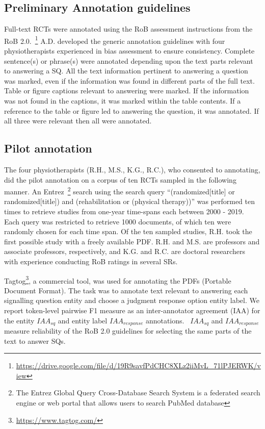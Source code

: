 \documentclass{IOS-Book-Article}
\begin{document}
\subsection{Preliminary Annotation guidelines}
\label{subsec:annot_guide}
%
Full-text RCTs were annotated using the RoB assessment instructions from the RoB 2.0.~\footnote{\url{https://drive.google.com/file/d/19R9savfPdCHC8XLz2iiMvL_71lPJERWK/view}}
A.D. developed the generic annotation guidelines with four physiotherapists experienced in bias assessment to ensure consistency.
Complete sentence(s) or phrase(s) were annotated depending upon the text parts relevant to answering a SQ.
All the text information pertinent to answering a question was marked, even if the information was found in different parts of the full text.
Table or figure captions relevant to answering were marked.
If the information was not found in the captions, it was marked within the table contents.
If a reference to the table or figure led to answering the question, it was annotated.
If all three were relevant then all were annotated.
%
\subsection{Pilot annotation}
\label{subsec:annotation}
%
The four physiotherapists (R.H., M.S., K.G., R.C.), who consented to annotating, did the pilot annotation on a corpus of ten RCTs sampled in the following manner.
An Entrez~\footnote{The Entrez Global Query Cross-Database Search System is a federated search engine or web portal that allows users to search PubMed database} search using the search query ``{\selectfont (randomized[title] or randomized[title]) and (rehabilitation or (physical therapy))}'' was performed ten times to retrieve studies from one-year time-spans each between 2000 - 2019.
Each query was restricted to retrieve 1000 documents, of which ten were randomly chosen for each time span.
Of the ten sampled studies, R.H. took the first possible study with a freely available PDF.
R.H. and M.S. are professors and associate professors, respectively, and K.G. and R.C. are doctoral researchers with experience conducting RoB ratings in several SRs.


Tagtog\footnote{\url{https://www.tagtog.com/}}, a commercial tool, was used for annotating the PDFs (Portable Document Format).
The task was to annotate text relevant to answering each signalling question entity and choose a judgment response option entity label.
We report token-level pairwise F1 measure as an inter-annotator agreement (IAA) for the entity $IAA_{sq}$ and entity label $IAA_{response}$ annotations.~\cite{deleger2012building}
$IAA_{sq}$ and $IAA_{response}$ measure reliability of the RoB 2.0 guidelines for selecting the same parts of the text to answer SQs.
%
%
%
\end{document}
